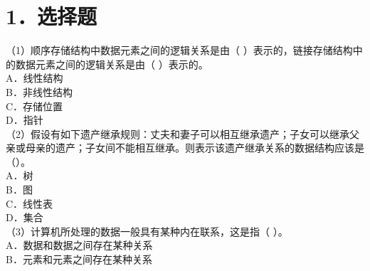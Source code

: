 \documentclass[10pt]{article}
\begin{document}
\section*{1．选择题}
（1）顺序存储结构中数据元素之间的逻辑关系是由（ ）表示的，链接存储结构中的数据元素之间的逻辑关系是由（ ）表示的。\\
A．线性结构\\
B．非线性结构\\
C．存储位置\\
D．指针\\
（2）假设有如下遗产继承规则：丈夫和妻子可以相互继承遗产；子女可以继承父亲或母亲的遗产；子女间不能相互继承。则表示该遗产继承关系的数据结构应该是（）。\\
A．树\\
B．图\\
C．线性表\\
D．集合\\
（3）计算机所处理的数据一般具有某种内在联系，这是指（ ）。\\
A．数据和数据之间存在某种关系\\
B．元素和元素之间存在某种关系
\end{document}
